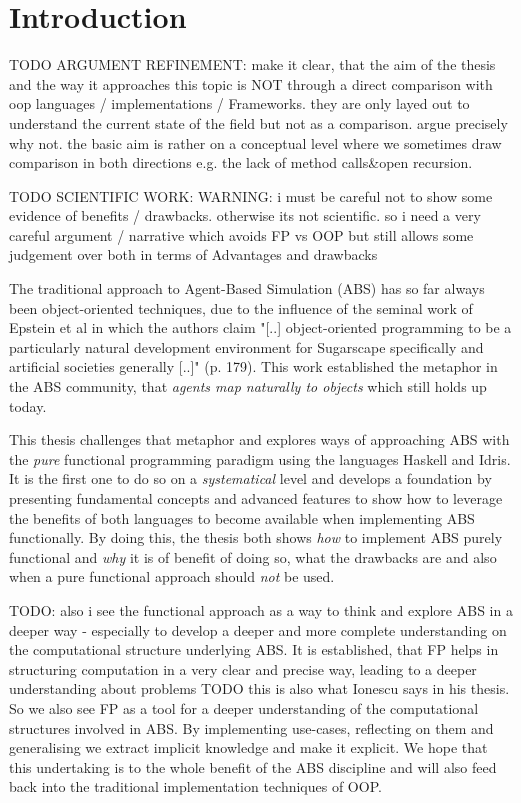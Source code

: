 \chapter{Introduction}
\label{ch:intro}

TODO ARGUMENT REFINEMENT: make it clear, that the aim of the thesis and the way it approaches this topic is NOT through a direct comparison with oop languages / implementations / Frameworks. they are only layed out to understand the current state of the field but not as a comparison. argue precisely why not. the basic aim is rather on a conceptual level where we sometimes draw comparison in both directions e.g. the lack of method calls\&open recursion.

TODO SCIENTIFIC WORK: WARNING: i must be careful not to show some evidence of benefits / drawbacks. otherwise its not scientific. so i need a very careful argument / narrative which avoids FP vs OOP but still allows some judgement over both in terms of Advantages and drawbacks


The traditional approach to Agent-Based Simulation (ABS) has so far always been object-oriented techniques, due to the influence of the seminal work of Epstein et al \cite{epstein_growing_1996} in which the authors claim "[..] object-oriented programming to be a particularly natural development environment for Sugarscape specifically and artificial societies generally [..]" (p. 179). This work established the metaphor in the ABS community, that \textit{agents map naturally to objects} \cite{north_managing_2007} which still holds up today.

This thesis challenges that metaphor and explores ways of approaching ABS with the \textit{pure} functional programming paradigm using the languages Haskell and Idris. It is the first one to do so on a \textit{systematical} level and develops a foundation by presenting fundamental concepts and advanced features to show how to leverage the benefits of both languages \cite{hudak_history_2007, brady_idris_2013} to become available when implementing ABS functionally. By doing this, the thesis both shows \textit{how} to implement ABS purely functional and \textit{why} it is of benefit of doing so, what the drawbacks are and also when a pure functional approach should \textit{not} be used. 

TODO: also i see the functional approach as a way to think and explore ABS in a deeper way - especially to develop a deeper and more complete understanding on the computational structure underlying ABS. It is established, that FP helps in structuring computation in a very clear and precise way, leading to a deeper understanding about problems TODO this is also what Ionescu says in his thesis. So we also see FP as a tool for a deeper understanding of the computational structures involved in ABS. By implementing use-cases, reflecting on them and generalising we extract implicit knowledge and make it explicit. We hope that this undertaking is to the whole benefit of the ABS discipline and will also feed back into the traditional implementation techniques of OOP.

